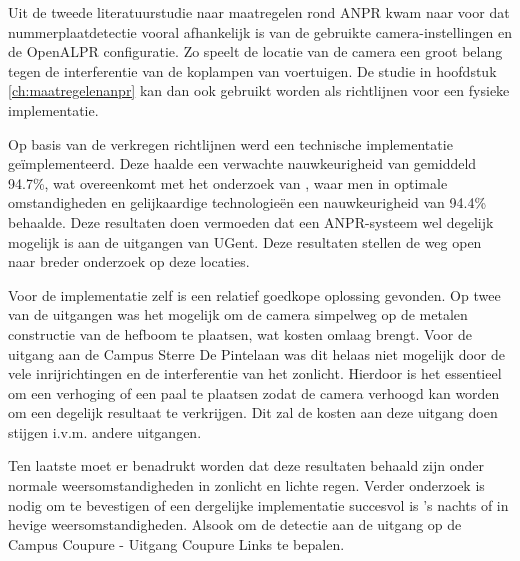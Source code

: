 Uit de tweede literatuurstudie naar maatregelen rond ANPR kwam naar voor dat nummerplaatdetectie vooral afhankelijk is van de gebruikte camera-instellingen en de OpenALPR configuratie. Zo speelt de locatie van de camera een groot belang tegen de interferentie van de koplampen van voertuigen. De studie in hoofdstuk \ref{ch:maatregelenanpr} kan dan ook gebruikt worden als richtlijnen voor een fysieke implementatie.

Op basis van de verkregen richtlijnen werd een technische implementatie geïmplementeerd. Deze haalde een verwachte nauwkeurigheid van gemiddeld 94.7\%, wat overeenkomt met het onderzoek van \textcite{figuerola2016automated}, waar men in optimale omstandigheden en gelijkaardige technologieën een nauwkeurigheid van 94.4\% behaalde. Deze resultaten doen vermoeden dat een ANPR-systeem wel degelijk mogelijk is aan de uitgangen van UGent. Deze resultaten stellen de weg open naar breder onderzoek op deze locaties.

Voor de implementatie zelf is een relatief goedkope oplossing gevonden. Op twee van de uitgangen was het mogelijk om de camera simpelweg op de metalen constructie van de hefboom te plaatsen, wat kosten omlaag brengt. Voor de uitgang aan de Campus Sterre De Pintelaan was dit helaas niet mogelijk door de vele inrijrichtingen en de interferentie van het zonlicht. Hierdoor is het essentieel om een verhoging of een paal te plaatsen zodat de camera verhoogd kan worden om een degelijk resultaat te verkrijgen. Dit zal de kosten aan deze uitgang doen stijgen i.v.m. andere uitgangen.

Ten laatste moet er benadrukt worden dat deze resultaten behaald zijn onder normale weersomstandigheden in zonlicht en lichte regen. Verder onderzoek is nodig om te bevestigen of een dergelijke implementatie succesvol is 's nachts of in hevige weersomstandigheden. Alsook om de detectie aan de uitgang op de Campus Coupure - Uitgang Coupure Links te bepalen.